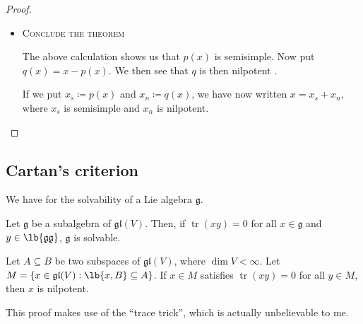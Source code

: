 \documentclass{article}
\DeclarePairedDelimiter\lb\lbrack\rbrack
\DeclareMathOperator{\tr}{tr}
\newcommand*\frkg{{\ensuremath{\mathfrak{g}}}}
\newcommand*\gl{\ensuremath{\mathfrak{gl}}}
\begin{document}
\begin{proof}
\begin{itemize}
        \item[\textbf{Step 2}] 
            \textsc{\color{Crimson} Conclude the theorem}

            The above calculation shows us that $p(x)$ is semisimple.
            Now put $q(x) = x - p(x)$.
            We then see that $q$ is then nilpotent .

            If we put $x_s \coloneq p(x)$ and $x_n \coloneq q(x)$, we have now written $x = x_s + x_n$, where $x_s$ is semisimple and $x_n$ is nilpotent.


    \end{itemize}

\end{proof}
\fi

\subsection{Cartan's criterion}

We have  for the solvability of a Lie algebra $\frkg$.

\begin{theorem}
    \label{thm:Cartan'sCriterion}
    Let $\frkg$ be a subalgebra of $\gl(V)$.
    Then, if $\tr(xy) = 0$ for all $x \in \frkg$ and $y \in \lb{\frkg\frkg}$, $\frkg$ is solvable.
\end{theorem}

\begin{lemma}
    \label{lem:TraceNilpotence}
    Let $A \subseteq B$ be two subspaces of $\gl(V)$, where $\dim V < \infty$.
    Let $M = \{x \in \gl(V) : \lb{x,B} \subseteq A\}$.
    If $x \in M$ satisfies $\tr(xy) = 0$ for all $y \in M$, then $x$ is nilpotent.
\end{lemma}

This proof makes use of the ``trace trick'', which is actually unbelievable to me.
\end{document}
